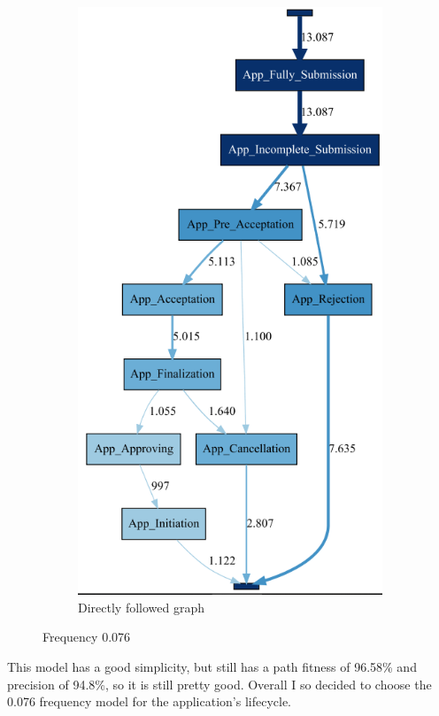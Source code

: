 \begin{figure}[!htbp]
\begin{subfigure}{0.5\textwidth}
  \centering
  \includegraphics[height=0.3\textheight]{App_DirectlyFollowedFreq0-076.PNG}
  \caption{Directly followed graph}
  \label{fig:APP_DF0-076}
\end{subfigure}%
\caption{Frequency 0.076}
\label{fig:App_Prec}
\end{figure}

This model has a good simplicity, but still has a path fitness of 96.58\% and precision of 94.8\%, so it is still pretty good. Overall I so decided to choose the 0.076 frequency model for the application's lifecycle.

